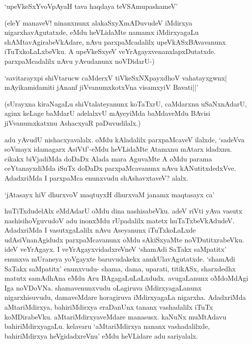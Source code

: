 \begin{shloka}
`upeVkeSxYvoVpAyaH tava haqdaya teVSAmupashameV'
\end{shloka}

(eleY manaveV! ninanxnunx alakaSxyXmADuvudeV iMdirxya nigarxhavAgutatxde, eMdu heVLidaMte namamx iMdirxyagaLu shAMtavAgirabeVkAdare, nAvu parxpaMcadalilx upeVkASxBAvavanunx iTuTxkoLaLxbeVku. A upeVkeSxyeV veYrAgayxvenanxlapxDutatxde. parxpaMcadalilx nAvu yAvudanunx noVDidarU-)

\begin{shloka}
`savitarayxpi shiVtarucw caMderxV tiVkeSxNX\s payxdhoV vahatayxgwnx|\\
mAyikamidamiti jAnanf jiVvanumxkotxVna visamxyiV Bavati||'
\end{shloka}

(sUrayxna kiraNagaLu shiVtalateyanunx koTaTxrU, caMdarxnu uSaNxnAdarU, aginx keLage baMdarU adelalxvU mAyeyiMda baMdaveMdu BAvisi jiVvanumxkatxnu AshacxyaR paDuvudilalx.)

adu yAvudU nishacxyavalalx. oMdu kAladalilx parxpaMcaveV ilalxde, `sadeVva soVmayx idamagarx AsiVtf'-eMdu heVLidaMte Atamxnu mAtarx idadxnu. cikakx biVjadiMda doDaDx Alada mara AguvaMte A oMdu parama ceYtanayxdiMda iSuTx doDaDx parxpaMcavanunx nAvu kANutitxdedxVve. AdadxriMda I parxpaMca enunxvudu shAshavxtaveV? alalx.

\begin{shloka}
`jAtasayx hiV dhurxvoV maqtuyxH dhurxvaM janamx maqtasayx ca'
\end{shloka} 

huTiTxdudelAlx eMdAdarU oMdu dina nashisabeVku. adeV riVti yAva vasutx nashisihoVguvudoV adu inonxMdu rUpadalilx matetx huTaTxbeVkAdudeV. AdadxriMda I vasutxgaLalilx nAvu Aseyanunx iTuTxkoLaLxde udAsiVnanAgidudx parxpaMcavanunx oMdu sAkiSxyaMte noVDutitxrabeVku. ideV veYrAgayx. I veYrAgayxvidadxreVneV `shamAdi SaTakx saMpatitx' enunxva mUraneya yoVgayxte baruvudakekx anukUlavAgutatxde. `shamAdi SaTakx saMpatitx' enunxvudu- shama, dama, uparati, titikASx, sharxdedhx matutx samAdhAna eMdu Aru BAgagaLuLaLxdudx. avugaLanunx oMdoMdAgi Iga noVDoVNa. shamavenunxvudu oLagiruva iMdirxyagaLanunx nigarxhisuvudu, damaveMdare horagiruva iMdirxyagaLa nigarxha. AdadxriMda aMtariMdirxya, bahiriMdirxya eraDanUnx tananx vashadalilx iTuTx koMDirabeVku. aMtariMdirxyaveMdare manasusx. kaNuNx muMtAdavu bahiriMdirxyagaLu. kelavaru `aMtariMdirxya nananx vashadalilxde, bahiriMdirxya heVgidadxreVnu' eMdu heVLidare adu sariyalalx.
 
